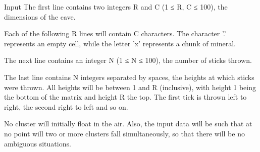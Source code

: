 Input
The first line contains two integers R and C (1 ≤ R, C ≤ 100), the dimensions of the cave.  

   Each of the following R lines will contain C characters. The character '.' represents an empty cell, while the letter 'x' represents a chunk of mineral.  

   The next line contains an integer N (1 ≤ N ≤ 100), the number of sticks thrown.  

   The last line contains N integers separated by spaces, the heights at which sticks were thrown. All heights will be between 1 and R (inclusive), with height 1 being the bottom of the matrix and height R the top. The first tick is thrown left to right, the second right to left and so on.  

   No cluster will initially float in the air. Also, the input data will be such that at no point will two or more clusters fall simultaneously, so that there will be no ambiguous situations.